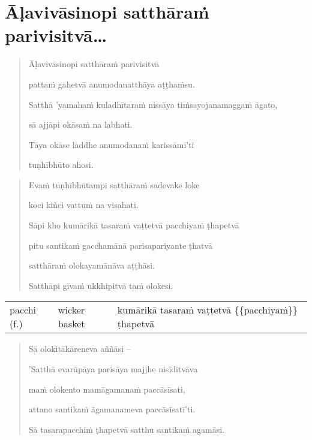\documentclass[11pt,oneside]{memoir}
\begin{document}

\clearpage

\section{Āḷavivāsinopi satthāraṁ parivisitvā\ldots{}}
\label{sec:org7a8a4df}

\begin{quote}
Āḷavivāsinopi satthāraṁ parivisitvā

pattaṁ gahetvā anumodanatthāya aṭṭhaṁsu.

Satthā 'yamahaṁ kuladhītaraṁ nissāya tiṁsayojanamaggaṁ āgato,

sā ajjāpi okāsaṁ na labhati.

Tāya okāse laddhe anumodanaṁ karissāmī'ti

tuṇhībhūto ahosi.
\end{quote}


\clearpage

\begin{quote}
Evaṁ tuṇhībhūtampi satthāraṁ sadevake loke

koci kiñci vattuṁ na visahati.

Sāpi kho kumārikā tasaraṁ vaṭṭetvā pacchiyaṁ ṭhapetvā

pitu santikaṁ gacchamānā parisapariyante ṭhatvā

satthāraṁ olokayamānāva aṭṭhāsi.

Satthāpi gīvaṁ ukkhipitvā taṁ olokesi.
\end{quote}

\begin{longtable}{L{\colOne} L{\colTwo} H}
pacchi (f.) & wicker basket & kumārikā tasaraṁ vaṭṭetvā \{\{pacchiyaṁ\}\} ṭhapetvā\\[0pt]
\end{longtable}


\clearpage

\begin{quote}
Sā olokitākāreneva aññāsi –

'Satthā evarūpāya parisāya majjhe nisīditvāva

maṁ olokento mamāgamanaṁ paccāsīsati,

attano santikaṁ āgamanameva paccāsīsatī'ti.

Sā tasarapacchiṁ ṭhapetvā satthu santikaṁ agamāsi.
\end{quote}
\end{document}
